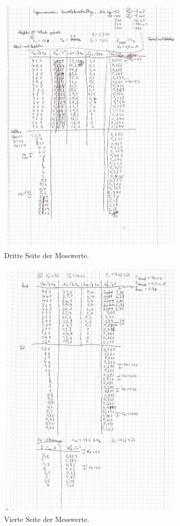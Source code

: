 \begin{figure}
  \centering
  \includegraphics[width=0.8\textwidth]{messwerte/3.pdf}
  \caption{Dritte Seite der Messwerte.}
  \label{fig:messwert3}
\end{figure}
\begin{figure}
  \centering
  \includegraphics[width=0.8\textwidth]{messwerte/4.pdf}
  \caption{Vierte Seite der Messwerte.}
  \label{fig:messwert4}
\end{figure}
